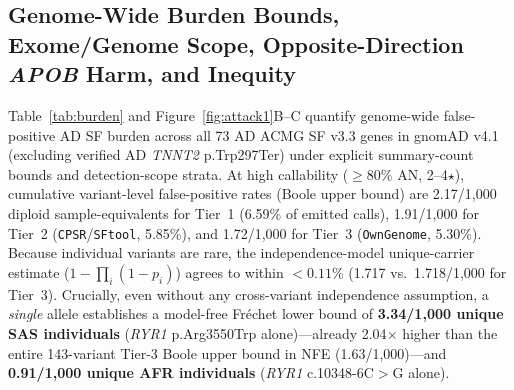 \documentclass[11pt,letterpaper]{article}
\begin{document}
\subsection{Genome-Wide Burden Bounds, Exome/Genome Scope, Opposite-Direction \textit{APOB} Harm, and Inequity}
Table~\ref{tab:burden} and Figure~\ref{fig:attack1}B--C quantify genome-wide false-positive AD SF burden across all 73 AD ACMG SF v3.3 genes in gnomAD v4.1 (excluding verified AD \textit{TNNT2} p.Trp297Ter) under explicit summary-count bounds and detection-scope strata. At high callability ($\ge 80\%$ AN, 2--4$\star$), cumulative variant-level false-positive rates (Boole upper bound) are 2.17/1,000 diploid sample-equivalents for Tier~1 (6.59\% of emitted calls), 1.91/1,000 for Tier~2 (\texttt{CPSR}/\texttt{SFtool}, 5.85\%), and 1.72/1,000 for Tier~3 (\texttt{OwnGenome}, 5.30\%). Because individual variants are rare, the independence-model unique-carrier estimate ($1-\prod_i(1-p_i)$) agrees to within $<0.11\%$ (1.717 vs.\ 1.718/1,000 for Tier~3). Crucially, even without any cross-variant independence assumption, a \emph{single} allele establishes a model-free Fr\'{e}chet lower bound of \textbf{3.34/1,000 unique SAS individuals} (\textit{RYR1} p.Arg3550Trp alone)---already 2.04$\times$ higher than the entire 143-variant Tier-3 Boole upper bound in NFE (1.63/1,000)---and \textbf{0.91/1,000 unique AFR individuals} (\textit{RYR1} c.10348-6C$>$G alone).
\end{document}
